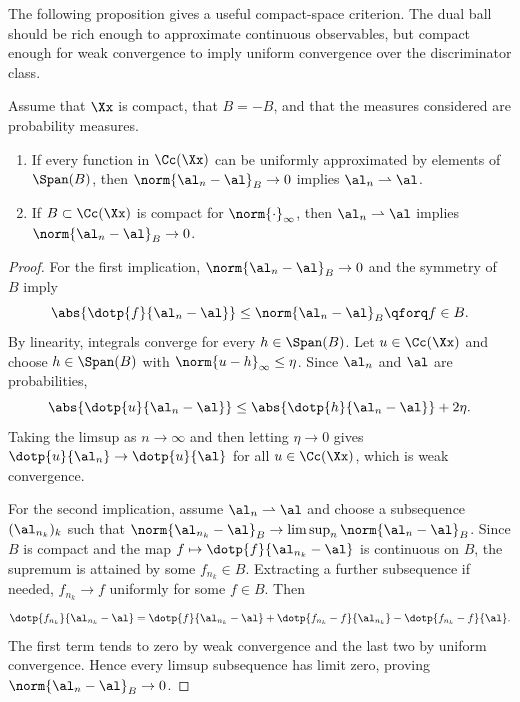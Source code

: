The following proposition gives a useful compact-space criterion. The dual ball should be rich enough to approximate continuous observables, but compact enough for weak convergence to imply uniform convergence over the discriminator class.

\begin{prop}\label{prop-dual-norm-metrization}
	Assume that $\Xx$ is compact, that $B=-B$, and that the measures considered are probability measures.
	\begin{enumerate}
		\item If every function in $\Cc(\Xx)$ can be uniformly approximated by elements of $\Span(B)$, then $\norm{\al_n-\al}_B \rightarrow 0$ implies $\al_n \rightharpoonup \al$.
		\item If $B \subset \Cc(\Xx)$ is compact for $\norm{\cdot}_\infty$, then $\al_n \rightharpoonup \al$ implies $\norm{\al_n-\al}_B \rightarrow 0$.
	\end{enumerate}
\end{prop}
\begin{proof}
	For the first implication, $\norm{\al_n-\al}_B\to0$ and the symmetry of $B$ imply
	\[
		\abs{\dotp{f}{\al_n-\al}}\leq \norm{\al_n-\al}_B
		\qforq f\in B.
	\]
	By linearity, integrals converge for every $h\in\Span(B)$. Let $u\in\Cc(\Xx)$ and choose $h\in\Span(B)$ with $\norm{u-h}_\infty\leq\eta$. Since $\al_n$ and $\al$ are probabilities,
	\[
		\abs{\dotp{u}{\al_n-\al}}
		\leq
		\abs{\dotp{h}{\al_n-\al}}+2\eta.
	\]
	Taking the limsup as $n\to\infty$ and then letting $\eta\to0$ gives $\dotp{u}{\al_n}\to\dotp{u}{\al}$ for all $u\in\Cc(\Xx)$, which is weak convergence.

	For the second implication, assume $\al_n\rightharpoonup\al$ and choose a subsequence $(\al_{n_k})_k$ such that $\norm{\al_{n_k}-\al}_B\to\limsup_n\norm{\al_n-\al}_B$. Since $B$ is compact and the map $f\mapsto\dotp{f}{\al_{n_k}-\al}$ is continuous on $B$, the supremum is attained by some $f_{n_k}\in B$. Extracting a further subsequence if needed, $f_{n_k}\to f$ uniformly for some $f\in B$. Then
	\[
		\dotp{f_{n_k}}{\al_{n_k}-\al}
		=
		\dotp{f}{\al_{n_k}-\al}
		+\dotp{f_{n_k}-f}{\al_{n_k}}
		-\dotp{f_{n_k}-f}{\al}.
	\]
	The first term tends to zero by weak convergence and the last two by uniform convergence. Hence every limsup subsequence has limit zero, proving $\norm{\al_n-\al}_B\to0$.
\end{proof}

